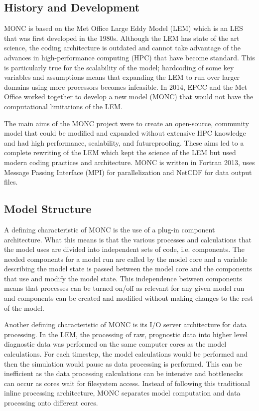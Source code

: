 \subsection{History and Development}
MONC is based on the Met Office Large Eddy Model (LEM) which is an LES that was first developed in the 1980s. Although the LEM has state of the art science, the coding architecture is outdated and cannot take advantage of the advances in high-performance computing (HPC) that have become standard. This is particularly true for the scalability of the model; hardcoding of some key variables and assumptions means that expanding the LEM to run over larger domains using more processors becomes infeasible. \citep{brown2015} In 2014, EPCC and the Met Office worked together to develop a new model (MONC) that would not have the computational limitations of the LEM. 

The main aims of the MONC project were to create an open-source, community model that could be modified and expanded without extensive HPC knowledge and had high performance, scalability, and futureproofing. These aims led to a complete rewriting of the LEM which kept the science of the LEM but used modern coding practices and architecture. MONC is written in Fortran 2013, uses Message Passing Interface (MPI) for parallelization and NetCDF for data output files. \citep{brown2015, brown2018}

\subsection{Model Structure}
A defining characteristic of MONC is the use of a plug-in component architecture. What this means is that the various processes and calculations that the model uses are divided into independent sets of code, i.e. components. The needed components for a model run are called by the model core and a variable describing the model state is passed between the model core and the components that use and modify the model state. This independence between components means that processes can be turned on/off as relevant for any given model run and components can be created and modified without making changes to the rest of the model. \citep{brown2015,moncCode}

Another defining characteristic of MONC is its I/O server architecture for data processing. In the LEM, the processing of raw, prognostic data into higher level diagnostic data was performed on the same computer cores as the model calculations. For each timestep, the model calculations would be performed and then the simulation would pause as data processing is performed. This can be inefficient as the data processing calculations can be intensive and bottlenecks can occur as cores wait for filesystem access. Instead of following this traditional inline processing architecture, MONC separates model computation and data processing onto different cores. \citep{brown2015, brown2018}

